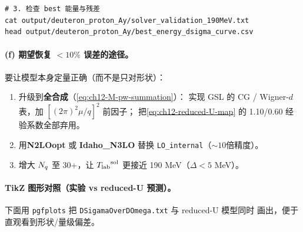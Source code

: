 \begin{numericalbox}[label={box:ch12-numerical-closure}]
\begin{lstlisting}[style=config]
# 3. 检查 best 能量与残差
cat output/deuteron_proton_Ay/solver_validation_190MeV.txt
head output/deuteron_proton_Ay/best_energy_dsigma_curve.csv
\end{lstlisting}

\paragraph{(f) 期望恢复 \(< 10\%\) 误差的途径。}
要让模型本身定量正确（而不是只对形状）：
\begin{enumerate}
  \item 升级到\textbf{全合成}（\cref{eq:ch12-M-pw-summation}）：
        实现 GSL 的 CG / Wigner-\(d\) 表，加 \([(2\pi)^2 \mu / q]^2\) 前因子；
        把\cref{eq:ch12-reduced-U-map} 的 1.10/0.60 经验系数全部弃用。
  \item 用\textbf{N2LOopt} 或 \textbf{Idaho\_N3LO} 替换 \texttt{LO\_internal}（\(\sim 10\)倍精度）。
  \item 增大 \(N_q\) 至 30+，让 \({T_{\text{lab}}}^{\rm sol}\) 更接近 190 MeV（\(\Delta < 5\) MeV）。
\end{enumerate}

\end{numericalbox}

\paragraph{TikZ 图形对照（实验 vs reduced-U 预测）。}
下面用 \texttt{pgfplots} 把 \texttt{DSigamaOverDOmega.txt} 与 reduced-U 模型同时
画出，便于直观看到形状/量级偏差。

